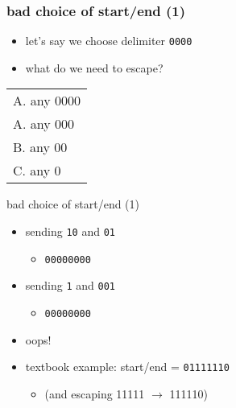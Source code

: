 \begin{frame}\frametitle{bad choice of start/end (1)}
    \begin{itemize}
    \item let's say we choose delimiter \texttt{0000}
    \item what do we need to escape?
    \end{itemize}
\begin{tabular}{l}
A. any 0000 \\
A. any 000 \\
B. any 00 \\
C. any 0 \\
\end{tabular}
\end{frame}

\begin{frame}{bad choice of start/end (1)}
    \begin{itemize}
    \item sending \texttt{10} and \texttt{01}
        \begin{itemize}
        \item {\tt {}00000000}
        \end{itemize}
    \item sending \texttt{1} and \texttt{001}
        \begin{itemize}
        \item {\tt {}00000000}
        \end{itemize}
    \vspace{.5cm}
    \item oops!
    \item textbook example: start/end = {\tt 01111110}
        \begin{itemize}
        \item (and escaping 11111 $\rightarrow$ 111110)
        \end{itemize}
    \end{itemize}
\end{frame}

